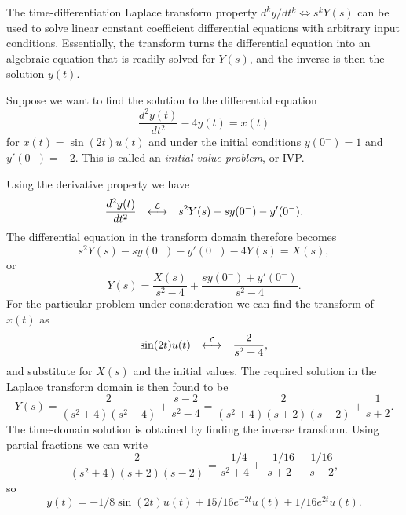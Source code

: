 \documentclass[10pt]{beamer}
\newcommand{\ltpair}{{\stackrel{\cal L}{\longleftrightarrow}}}
\begin{document}
The time-differentiation Laplace transform property $d^k y/dt^k \Longleftrightarrow s^k Y(s)$ can be used to solve linear constant coefficient differential equations with arbitrary input conditions.  Essentially, the transform turns the differential equation into an algebraic equation that is readily solved for $Y(s)$, and the inverse is then the solution $y(t)$.

Suppose we want to find the solution to the differential equation
\begin{equation*}
  \frac{d^2 y(t)}{dt^2} - 4 y(t) = x(t)
\end{equation*}
for $x(t) = \sin(2t) u(t)$ and under the initial conditions $y(0^-)=1$ and $y'(0^-)=-2$.  This is called an {\em initial value problem}, or IVP.

Using the derivative property we have
\begin{equation*}
  \frac{d^2 y(t)}{dt^2} \quad \ltpair \quad s^2 Y(s) - s y(0^-) - y'(0^-).
\end{equation*}
The differential equation in the transform domain therefore becomes
\begin{equation*}
  s^2 Y(s) - s y(0^-) - y'(0^-) - 4 Y(s) = X(s),
\end{equation*}
or
\begin{equation*}
  Y(s) = \frac{X(s)}{s^2-4} + \frac{s y(0^-) + y'(0^-)}{s^2-4}.
\end{equation*}
For the particular problem under consideration we can find the transform of $x(t)$ as
\begin{equation*}
  \sin(2t) u(t) \quad \ltpair \quad \frac{2}{s^2 + 4},
\end{equation*}
and substitute for $X(s)$ and the initial values.  The required solution in the Laplace transform domain is then found to be
\begin{equation*}
  Y(s) = \frac{2}{(s^2+4)(s^2-4)} + \frac{s-2}{s^2-4} = \frac{2}{(s^2+4)(s+2)(s-2)} + \frac{1}{s+2}.
\end{equation*}
The time-domain solution is obtained by finding the inverse transform.  Using partial fractions we can write
\begin{equation*}
  \frac{2}{(s^2+4)(s+2)(s-2)} = \frac{-1/4}{s^2+4} + \frac{-1/16}{s+2} + \frac{1/16}{s-2},
\end{equation*}
so
\begin{equation*}
  y(t) = -1/8 \sin(2 t) u(t) + 15/16 e^{-2 t} u(t) + 1/16 e^{2 t} u(t).
\end{equation*}
\end{document}
